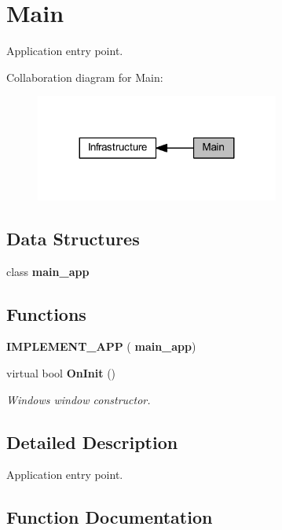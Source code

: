 \section{Main}
\label{group___main}


Application entry point.  


Collaboration diagram for Main\+:
\nopagebreak
\begin{figure}[H]
\begin{center}
\leavevmode
\includegraphics[width=227pt]{group___main}
\end{center}
\end{figure}
\subsection*{Data Structures}
\begin{DoxyCompactItemize}
\item 
class \textbf{ main\+\_\+app}
\end{DoxyCompactItemize}
\subsection*{Functions}
\begin{DoxyCompactItemize}
\item 
\textbf{ I\+M\+P\+L\+E\+M\+E\+N\+T\+\_\+\+A\+PP} (\textbf{ main\+\_\+app})
\item 
virtual bool \textbf{ On\+Init} ()
\begin{DoxyCompactList}\small\item\em Windows window constructor. \end{DoxyCompactList}\end{DoxyCompactItemize}


\subsection{Detailed Description}
Application entry point. 



\subsection{Function Documentation}
\mbox{\label{group___main_gaebfea8791071ccc2c05f0891cde86213}} 
